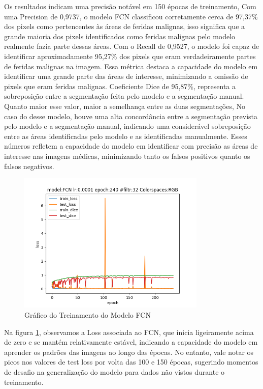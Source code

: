         Os resultados indicam uma precisão notável em 150 épocas de treinamento, Com uma Precision de 0,9737, o modelo \ac{FCN} classificou corretamente cerca de 97,37\% dos pixels como pertencentes às áreas de feridas malignas, isso significa que a grande maioria dos pixels identificados como feridas malignas pelo modelo realmente fazia parte dessas áreas. Com o  Recall de 0,9527, o modelo foi capaz de identificar aproximadamente 95,27\% dos pixels que eram verdadeiramente partes de feridas malignas na imagem. Essa métrica destaca a capacidade do modelo em identificar uma grande parte das áreas de interesse, minimizando a omissão de pixels que eram feridas malignas. Coeficiente Dice de 95,87\%, representa a sobreposição entre a segmentação feita pelo modelo e a segmentação manual. Quanto maior esse valor, maior a semelhança entre as duas segmentações, No caso do desse modelo, houve uma alta concordância entre a segmentação prevista pelo modelo e a segmentação manual, indicando uma considerável sobreposição entre as áreas identificadas pelo modelo e as identificadas manualmente. Esses números refletem a capacidade do modelo em identificar com precisão as áreas de interesse nas imagens médicas, minimizando tanto os falsos positivos quanto os falsos negativos.
      
          \begin{figure}[H]
            \centering
            \includegraphics[width=0.8\textwidth]{img/fcnmodelfile.png}
            \caption{ Gráfico do Treinamento do Modelo \acf{FCN} }
            \label{fig:graphFCN}
          \end{figure}

        Na figura \ref{fig:graphFCN}, observamos a Loss associada ao FCN, que inicia ligeiramente acima de zero e se mantém relativamente estável, indicando a capacidade do modelo em aprender os padrões das imagens ao longo das épocas. No entanto, vale notar os picos nos valores de test loss por volta das 100 e 150 épocas, sugerindo momentos de desafio na generalização do modelo para dados não vistos durante o treinamento.

